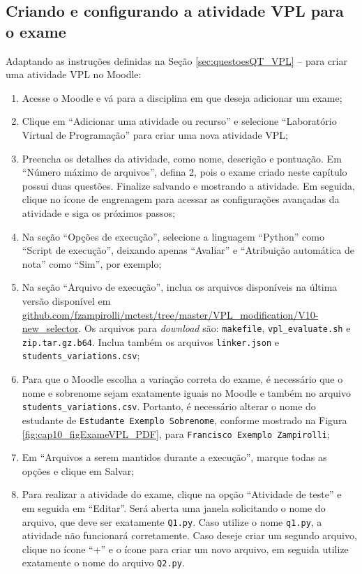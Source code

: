 \subsection{Criando e configurando a atividade VPL para o exame}

Adaptando as instruções definidas na Seção \ref{sec:questoesQT_VPL} --  para criar uma atividade VPL no Moodle:

\begin{enumerate}
    \item Acesse o Moodle e vá para a disciplina em que deseja adicionar um exame;
    \item Clique em ``Adicionar uma atividade ou recurso'' e selecione ``Laboratório Virtual de Programação'' para criar uma nova atividade VPL;

    \item Preencha os detalhes da atividade, como nome, descrição e pontuação. Em ``Número máximo de arquivos'', defina 2, pois o exame criado neste capítulo possui duas questões. Finalize salvando e mostrando a atividade. Em seguida, clique no ícone de engrenagem para acessar as configurações avançadas da atividade e siga os próximos passos;

    \item Na seção ``Opções de execução'', selecione a linguagem ``Python'' como ``Script de execução'', deixando apenas ``Avaliar'' e ``Atribuição automática de nota'' como ``Sim'', por exemplo;

    \item Na seção ``Arquivo de execução'', inclua os arquivos disponíveis na última versão disponível em \href{https://github.com/fzampirolli/mctest/tree/master/VPL_modification}{github.com/fzampirolli/mctest/tree/master/VPL\_modification/V10-new\_selector}. Os arquivos para \textit{download} são: \verb|makefile|, \verb|vpl_evaluate.sh| e \verb|zip.tar.gz.b64|. Inclua também os arquivos \verb|linker.json| e \verb|students_variations.csv|;

    \item Para que o Moodle escolha a variação correta do exame, é necessário que o nome e sobrenome sejam exatamente iguais no Moodle e também no arquivo \verb|students_variations.csv|. Portanto, é necessário alterar o nome  do estudante de \verb|Estudante Exemplo Sobrenome|, conforme mostrado na Figura \ref{fig:cap10_figExameVPL_PDF}, para \verb|Francisco Exemplo Zampirolli|;

    \item Em ``Arquivos a serem mantidos durante a execução'', marque todas as opções e clique em Salvar;

    \item Para realizar a atividade do exame, clique na opção ``Atividade de teste'' e em seguida em ``Editar''. Será aberta uma janela solicitando o nome do arquivo, que deve ser exatamente \verb|Q1.py|. Caso utilize o nome \verb|q1.py|, a atividade não funcionará corretamente. Caso deseje criar um segundo arquivo, clique no ícone ``+'' e o ícone para criar um novo arquivo, em seguida utilize exatamente o nome do arquivo \verb|Q2.py|.
    
\end{enumerate}

